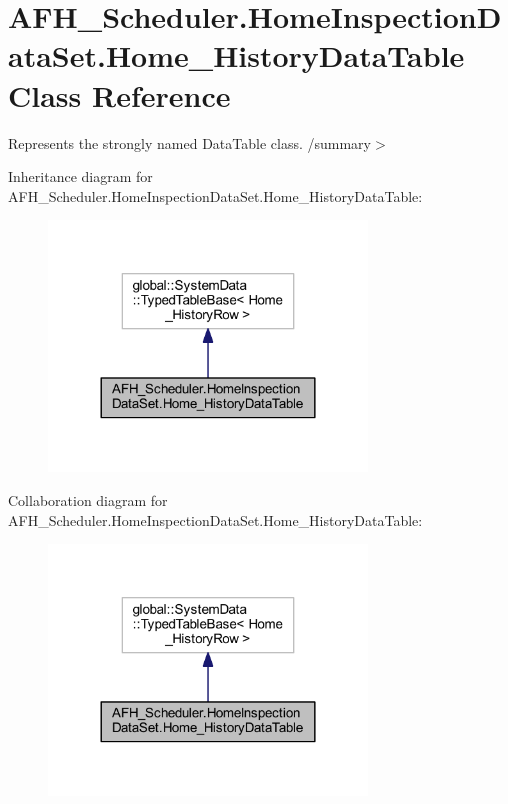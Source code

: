\section{A\+F\+H\+\_\+\+Scheduler.\+Home\+Inspection\+Data\+Set.\+Home\+\_\+\+History\+Data\+Table Class Reference}
\label{class_a_f_h___scheduler_1_1_home_inspection_data_set_1_1_home___history_data_table}


Represents the strongly named Data\+Table class. /summary$>$  




Inheritance diagram for A\+F\+H\+\_\+\+Scheduler.\+Home\+Inspection\+Data\+Set.\+Home\+\_\+\+History\+Data\+Table\+:
\nopagebreak
\begin{figure}[H]
\begin{center}
\leavevmode
\includegraphics[width=240pt]{class_a_f_h___scheduler_1_1_home_inspection_data_set_1_1_home___history_data_table__inherit__graph}
\end{center}
\end{figure}


Collaboration diagram for A\+F\+H\+\_\+\+Scheduler.\+Home\+Inspection\+Data\+Set.\+Home\+\_\+\+History\+Data\+Table\+:
\nopagebreak
\begin{figure}[H]
\begin{center}
\leavevmode
\includegraphics[width=240pt]{class_a_f_h___scheduler_1_1_home_inspection_data_set_1_1_home___history_data_table__coll__graph}
\end{center}
\end{figure}
